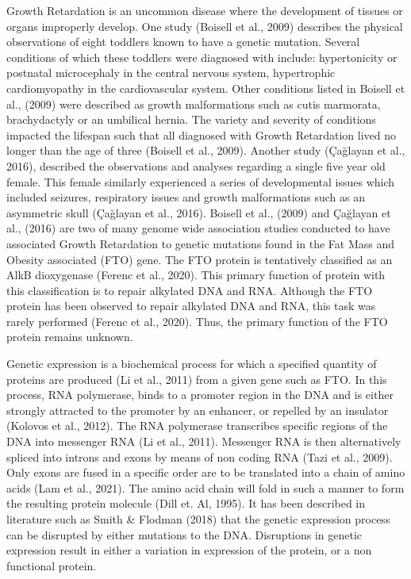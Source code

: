 \documentclass[11pt]{article}
\begin{document}
Growth Retardation is an uncommon disease where the development of tissues or organs improperly develop. One study (Boisell et al., 2009) describes the physical observations of eight toddlers known to have a genetic mutation. Several conditions of which these toddlers were diagnosed with include: hypertonicity or postnatal microcephaly in the central nervous system, hypertrophic cardiomyopathy in the cardiovascular system. Other conditions listed in Boisell et al., (2009) were described as growth malformations such as cutis marmorata, brachydactyly or an umbilical hernia. The variety and severity of conditions impacted the lifespan such that all diagnosed with Growth Retardation lived no longer than the age of three (Boisell et al., 2009). Another study (Çağlayan et al., 2016), described the observations and analyses regarding a single five year old female. This female similarly experienced a series of developmental issues which included seizures, respiratory issues and growth malformations such as an asymmetric skull (Çağlayan et al., 2016). Boisell et al., (2009) and Çağlayan et al., (2016) are two of many genome wide association studies conducted to have associated Growth Retardation to genetic mutations found in the Fat Mass and Obesity associated (FTO) gene. The FTO protein is tentatively classified as an AlkB dioxygenase (Ferenc et al., 2020). This primary function of protein with this classification is to repair alkylated DNA and RNA. Although the FTO protein has been observed to repair alkylated DNA and RNA, this task was rarely performed (Ferenc et al., 2020). Thus, the primary function of the FTO protein remains unknown. 

Genetic expression is a biochemical process for which a specified quantity of proteins are produced (Li et al., 2011) from a given gene such as FTO. In this process, RNA polymerase, binds to a promoter region in the DNA and is either strongly attracted to the promoter by an enhancer, or repelled by an insulator (Kolovos et al., 2012). The RNA polymerase transcribes specific regions of the DNA into messenger RNA (Li et al., 2011). Messenger RNA is then alternatively spliced into introns and exons by means of non coding RNA (Tazi et al., 2009). Only exons are fused in a specific order are to be translated into a chain of amino acids (Lam et al., 2021). The amino acid chain will fold in such a manner to form the resulting protein molecule (Dill et. Al, 1995). It has been described in literature such as Smith & Flodman (2018) that the genetic expression process can be disrupted by either mutations to the DNA. Disruptions in genetic expression result in either a variation in expression of the protein, or a non functional protein. 
\end{document}
